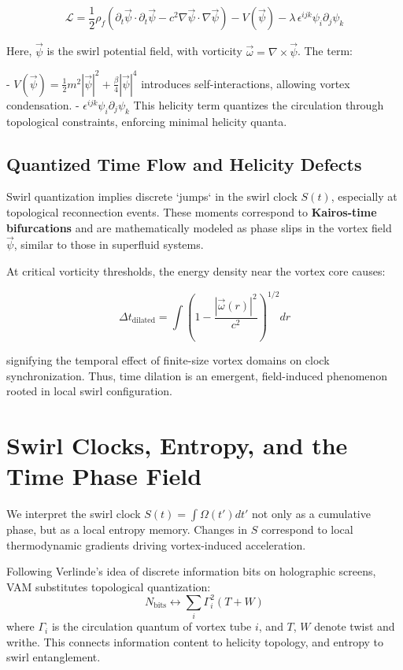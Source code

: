 \documentclass[12pt]{article}
\begin{document}
\[
    \mathcal{L} = \frac{1}{2} \rho_{\scriptscriptstyle\boldsymbol\!f} \left( \partial_t \vec{\psi} \cdot \partial_t \vec{\psi} - c^2 \nabla \vec{\psi} \cdot \nabla \vec{\psi} \right) - V(\vec{\psi}) - \lambda \, \epsilon^{ijk} \psi_i \partial_j \psi_k
\]

Here, \( \vec{\psi} \) is the swirl potential field, with vorticity \( \vec{\omega} = \nabla \times \vec{\psi} \). The term:

- \( V(\vec{\psi}) = \frac{1}{2} m^2 |\vec{\psi}|^2 + \frac{\beta}{4} |\vec{\psi}|^4 \) introduces self-interactions, allowing vortex condensation.
- \( \epsilon^{ijk} \psi_i \partial_j \psi_k \) This helicity term quantizes the circulation through topological constraints, enforcing minimal helicity quanta.

\subsection{Quantized Time Flow and Helicity Defects}

Swirl quantization implies discrete `jumps` in the swirl clock \( S(t) \), especially at topological reconnection events. These moments correspond to \textbf{Kairos-time bifurcations} and are mathematically modeled as phase slips in the vortex field \( \vec{\psi} \), similar to those in superfluid systems.

At critical vorticity thresholds, the energy density near the vortex core causes:

\[
    \Delta t_{\text{dilated}} = \int \left( 1 - \frac{|\vec{\omega}(r)|^2}{c^2} \right)^{1/2} dr
\]

signifying the temporal effect of finite-size vortex domains on clock synchronization. Thus, time dilation is an emergent, field-induced phenomenon rooted in local swirl configuration.


    \section{Swirl Clocks, Entropy, and the Time Phase Field}

    We interpret the swirl clock \( S(t) = \int \Omega(t') dt' \) not only as a cumulative phase, but as a local entropy memory. Changes in \( S \) correspond to local thermodynamic gradients driving vortex-induced acceleration.

    Following Verlinde’s idea of discrete information bits on holographic screens, VAM substitutes topological quantization:
    \[
        N_{\text{bits}} \longleftrightarrow \sum_i \Gamma_i^2 (T + W)
    \]
    where \( \Gamma_i \) is the circulation quantum of vortex tube \( i \), and \( T \), \( W \) denote twist and writhe. This connects information content to helicity topology, and entropy to swirl entanglement.
\end{document}
